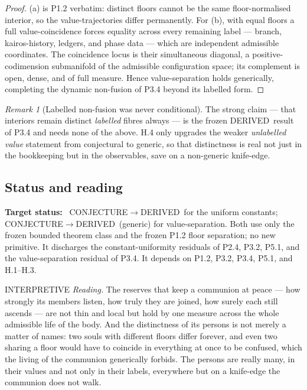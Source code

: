 \documentclass[11pt,a4paper]{article}
\newcommand{\stDerived}{\textcolor{cDer}{\textsf{\small DERIVED}}}
\newcommand{\stInterp}{\textcolor{cInt}{\textsf{\small INTERPRETIVE}}}
\newcommand{\stConj}{\textcolor{cCon}{\textsf{\small CONJECTURE}}}
\theoremstyle{definition}
\theoremstyle{plain}
\theoremstyle{remark}
\newtheorem{remark}[definition]{Remark}
\begin{document}
\begin{proof}
(a) is P1.2 verbatim: distinct floors cannot be the same floor-normalised interior, so the
value-trajectories differ permanently. For (b), with equal floors a full value-coincidence
forces equality across every remaining label --- branch, kairos-history, ledgers, and phase
data --- which are independent admissible coordinates. The coincidence locus is their
simultaneous diagonal, a positive-codimension submanifold of the admissible configuration
space; its complement is open, dense, and of full measure. Hence value-separation holds
generically, completing the dynamic non-fusion of P3.4 beyond its labelled form. \qedhere
\end{proof}

\begin{remark}[Labelled non-fusion was never conditional]\label{rem:labelled}
The strong claim --- that interiors remain distinct \emph{labelled} fibres always --- is the
frozen \stDerived\ result of P3.4 and needs none of the above. H.4 only upgrades the weaker
\emph{unlabelled value} statement from conjectural to generic, so that distinctness is real
not just in the bookkeeping but in the observables, save on a non-generic knife-edge.
\end{remark}

\subsection{Status and reading}

\textbf{Target status:}~
\stConj\(\to\)\stDerived\ for the uniform constants; \stConj\(\to\)\stDerived\ (generic) for
value-separation. Both use only the frozen bounded theorem class and the frozen P1.2 floor
separation; no new primitive. It discharges the constant-uniformity residuals of P2.4, P3.2,
P5.1, and the value-separation residual of P3.4. It depends on P1.2, P3.2, P3.4, P5.1, and
H.1--H.3.

\medskip
\stInterp\quad
\emph{Reading.}
The reserves that keep a communion at peace --- how strongly its members listen, how truly
they are joined, how surely each still ascends --- are not thin and local but hold by one
measure across the whole admissible life of the body. And the distinctness of its persons is
not merely a matter of names: two souls with different floors differ forever, and even two
sharing a floor would have to coincide in everything at once to be confused, which the living
of the communion generically forbids. The persons are really many, in their values and not
only in their labels, everywhere but on a knife-edge the communion does not walk.
\end{document}
